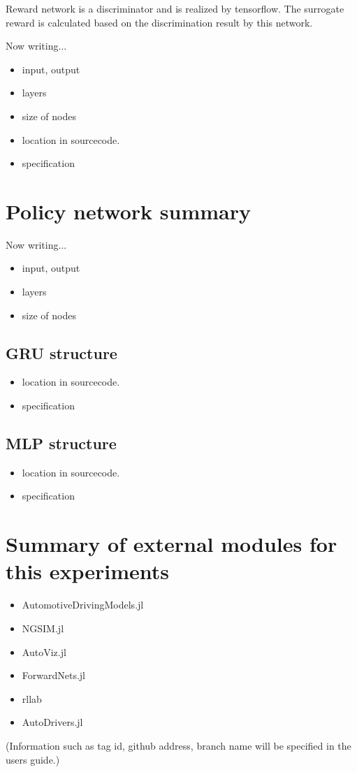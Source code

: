 Reward network is a discriminator and is realized by tensorflow. The surrogate reward is calculated based on the discrimination result by this network.


Now writing...
\begin{itemize}
\item input, output
\item layers
\item size of nodes
\end{itemize}

\begin{itemize}
\item location in sourcecode.
\item specification
\end{itemize}


\section{Policy network summary}

Now writing...

\begin{itemize}
\item input, output
\item layers
\item size of nodes
\end{itemize}

\subsection{GRU structure}

\begin{itemize}
\item location in sourcecode.
\item specification
\end{itemize}

\subsection{MLP structure}

\begin{itemize}
\item location in sourcecode.
\item specification
\end{itemize}

\section{Summary of external modules for this experiments}

\begin{itemize}
\item AutomotiveDrivingModels.jl
\item NGSIM.jl
\item AutoViz.jl
\item ForwardNets.jl
\item rllab
\item AutoDrivers.jl
\end{itemize}

(Information such as tag id, github address, branch name will be specified in the users guide.)

